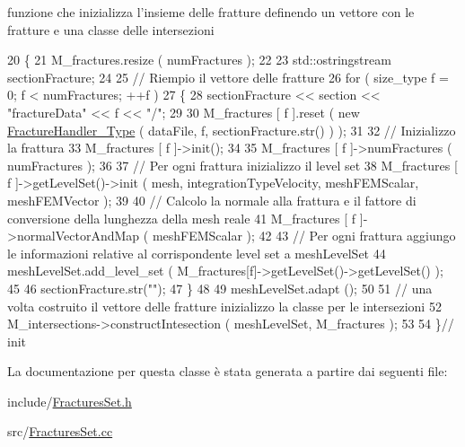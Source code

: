funzione che inizializza l'insieme delle fratture definendo un vettore con le fratture e una classe delle intersezioni 


\begin{DoxyCode}
20 \{
21         M\_fractures.resize ( numFractures );
22 
23         std::ostringstream sectionFracture;
24 
25         \textcolor{comment}{// Riempio il vettore delle fratture}
26         \textcolor{keywordflow}{for} ( size\_type f = 0; f < numFractures; ++f )
27         \{
28                 sectionFracture << section << \textcolor{stringliteral}{"fractureData"} << f << \textcolor{stringliteral}{"/"};
29 
30                 M\_fractures [ f ].reset ( \textcolor{keyword}{new} \hyperlink{classFractureHandler}{FractureHandler\_Type} ( dataFile, f, 
      sectionFracture.str() ) );
31 
32                 \textcolor{comment}{// Inizializzo la frattura  }
33                 M\_fractures [ f ]->init();
34 
35                 M\_fractures [ f ]->numFractures ( numFractures );
36 
37                 \textcolor{comment}{// Per ogni frattura inizializzo il level set}
38                 M\_fractures [ f ]->getLevelSet()->init ( mesh, integrationTypeVelocity, meshFEMScalar, 
      meshFEMVector );
39 
40                 \textcolor{comment}{// Calcolo la normale alla frattura e il fattore di conversione della lunghezza della mesh
       reale}
41                 M\_fractures [ f ]->normalVectorAndMap ( meshFEMScalar );
42 
43                 \textcolor{comment}{// Per ogni frattura aggiungo le informazioni relative al corrispondente level set a
       meshLevelSet}
44                 meshLevelSet.add\_level\_set ( M\_fractures[f]->getLevelSet()->getLevelSet() );
45 
46                 sectionFracture.str(\textcolor{stringliteral}{""});
47         \}
48 
49         meshLevelSet.adapt ();
50 
51         \textcolor{comment}{// una volta costruito il vettore delle fratture inizializzo la classe per le intersezioni}
52         M\_intersections->constructIntesection ( meshLevelSet, M\_fractures );
53 
54 \}\textcolor{comment}{// init}
\end{DoxyCode}


La documentazione per questa classe è stata generata a partire dai seguenti file\-:\begin{DoxyCompactItemize}
\item 
include/\hyperlink{FracturesSet_8h}{Fractures\-Set.\-h}\item 
src/\hyperlink{FracturesSet_8cc}{Fractures\-Set.\-cc}\end{DoxyCompactItemize}
